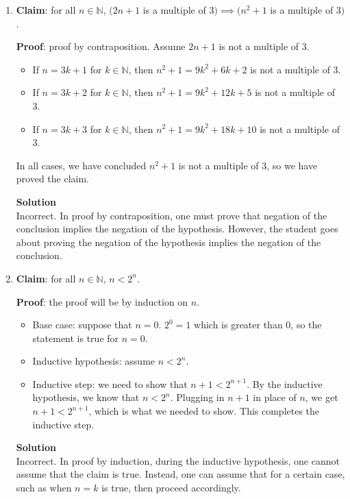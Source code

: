 \documentclass[11pt]{article}
\newenvironment{Parts}{\begin{enumerate}[label=(\alph*)]}{\end{enumerate}}
\newcommand*{\Part}{\item}
\newcommand*{\N}{\mathbb{N}}
\begin{document}
\begin{Parts}

\Part \textbf{Claim}: for all $n\in\N$, $(2n+1$ is a multiple of $3) \implies (n^2+1$ is a multiple of $3)$.

\textbf{Proof}: proof by contraposition. Assume $2n+1$ is not a multiple of 3.
\begin{itemize}
\item If $n=3k+1$ for $k\in\N$, then $n^2+1=9k^2+6k+2$ is not a multiple of 3.
\item If $n=3k+2$ for $k\in\N$, then $n^2+1=9k^2+12k+5$ is not a multiple of 3.
\item If $n=3k+3$ for $k\in\N$, then $n^2+1=9k^2+18k+10$ is not a multiple of 3.
\end{itemize}
In all cases, we have concluded $n^2+1$ is not a multiple of 3, so we have proved the claim.

\begin{mdframed} \textbf{Solution} \\
Incorrect. In proof by contraposition, one must prove that negation of the conclusion implies the negation of the hypothesis. However, the student goes about proving the negation of the hypothesis implies the negation of the conclusion.
\end{mdframed}

\Part \textbf{Claim}: for all $n\in\N$, $n<2^n$.

\textbf{Proof}: the proof will be by induction on $n$.
\begin{itemize}
\item Base case: suppose that $n=0$. $2^0=1$ which is greater than $0$, so the statement is true for $n=0$.
\item Inductive hypothesis: assume $n<2^n$.
\item Inductive step: we need to show that $n+1<2^{n+1}$. By the inductive hypothesis, we know that $n<2^n$. Plugging in $n+1$ in place of $n$, we get $n+1<2^{n+1}$, which is what we needed to show. This completes the inductive step.
\end{itemize}

\begin{mdframed} \textbf{Solution} \\
Incorrect. In proof by induction, during the inductive hypothesis, one cannot assume that the claim is true. Instead, one can assume that for a certain case, such as when $n=k$ is true, then proceed accordingly.
\end{mdframed}


\end{Parts}
\end{document}
